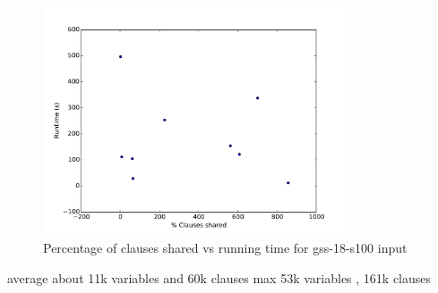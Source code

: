 \documentclass{article}
\begin{document}
\begin{figure}[h]
  \centering
  \includegraphics[width=0.8\textwidth]{../figs/gss-18-s100.pdf}
  \caption{Percentage of clauses shared vs running time for gss-18-s100 input}
  \label{fig:gss}
\end{figure}

average about 11k variables and 60k clauses
max 53k variables , 161k clauses



\end{document}
